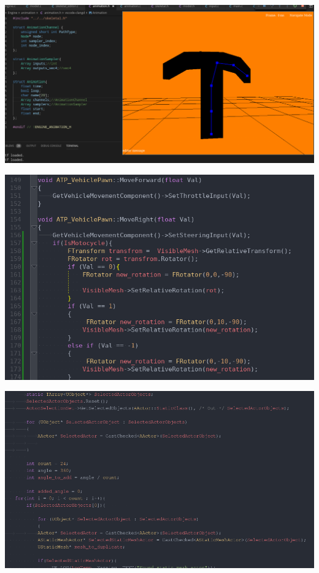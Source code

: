 \documentclass{article}
\begin{document}
  \includegraphics[width=\textwidth]{51.png}
  
  \includegraphics[width=\textwidth]{52.png}

  \includegraphics[width=\textwidth]{53.png}
\end{document}
